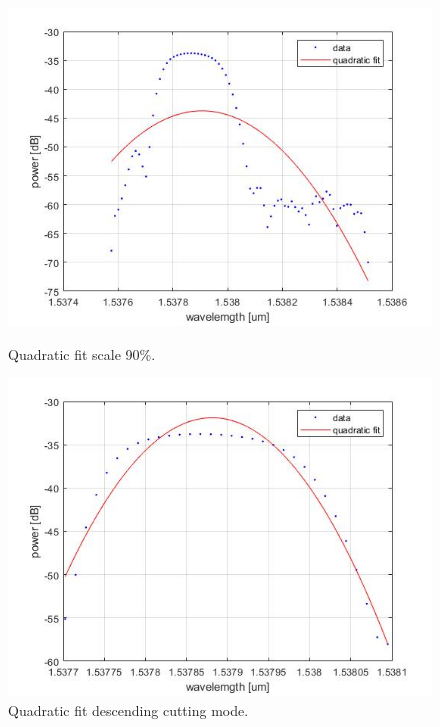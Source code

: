 \begin{figure}[!htb]
    \centering
    \includegraphics[scale=0.4]{img/quadratic_fit_scale_90.jpg}
    \caption{Quadratic fit scale 90\%.}
    \label{fig:quadratic_fit_scale}
  \endminipage\hfill
    \centering
    \includegraphics[scale=0.4]{img/quadratic_fit.jpg}
    \caption{Quadratic fit descending cutting mode.}
    \label{fig:quadratic_fit}
  \endminipage
\end{figure}

